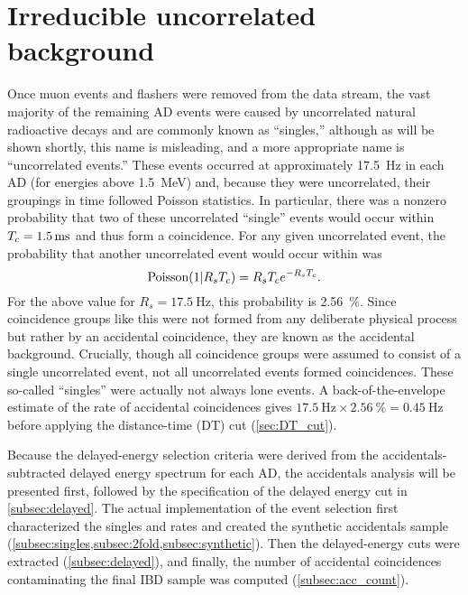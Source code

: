 \section{Irreducible uncorrelated background}
\label{sec:acc}

Once muon events and flashers were removed from the data stream,
the vast majority of the remaining AD events were caused by uncorrelated
natural radioactive decays and are commonly known as ``singles,''
although as will be shown shortly, this name is misleading,
and a more appropriate name is ``uncorrelated events.''
These events occurred at approximately \SI{17.5}{\hertz} in each AD
(for energies above \SI{1.5}{\MeV})
and,
because they were uncorrelated, their groupings in time followed Poisson statistics.
In particular, there was a nonzero probability that
two of these uncorrelated ``single'' events would occur within
$T_c=\SI{1.5}{\milli\second}$ and thus form a  coincidence.
For any given uncorrelated event, the probability that
another uncorrelated event would occur within \tc{} was
\begin{equation}
    \text{Poisson}(1\vert R_sT_c) = R_sT_c e^{-R_sT_c}.
\end{equation}
For the above value for $R_s=\SI{17.5}{\hertz}$, this probability is \SI{2.56}{\percent}.
Since  coincidence groups like this were not formed from any
deliberate physical process but rather by an accidental coincidence,
they are known as the accidental background.
Crucially, though all  coincidence groups
were assumed to consist of a single uncorrelated event,
not all uncorrelated events formed  coincidences.
These so-called ``singles'' were actually not always lone events.
A back-of-the-envelope estimate of the rate of accidental coincidences gives
$\SI{17.5}{\hertz}\times\SI{2.56}{\percent}=\SI{0.45}{\hertz}$
before applying the distance-time (DT) cut (\cref{sec:DT_cut}).

Because the delayed-energy selection criteria
were derived from the accidentals-subtracted delayed energy spectrum for each AD,
the accidentals analysis will be presented first,
followed by the specification of the delayed energy cut in \cref{subsec:delayed}.
The actual implementation of the event selection
first characterized the singles and  rates
and created the synthetic accidentals sample
(\cref{subsec:singles,subsec:2fold,subsec:synthetic}).
Then the delayed-energy cuts were extracted (\cref{subsec:delayed}),
and finally, the number of accidental coincidences
contaminating the final IBD sample was computed (\cref{subsec:acc_count}).

